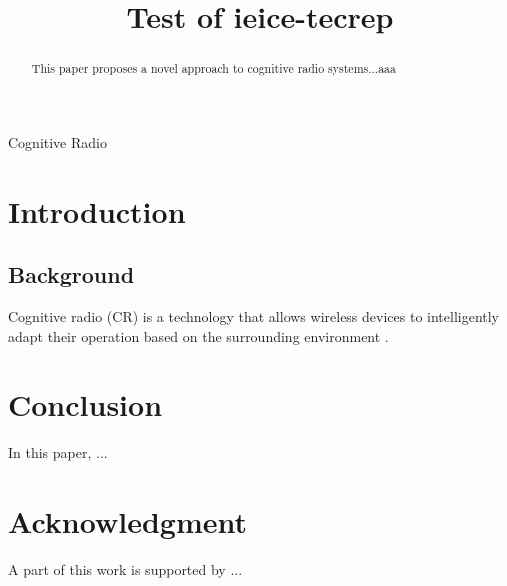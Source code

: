 \documentclass{ieice-tecrep}
\title{Test of ieice-tecrep}
\subtitle{}
\begin{document}
\begin{abstract}
    This paper proposes a novel approach to cognitive radio systems...aaa
\end{abstract}

\begin{keyword}
    Cognitive Radio
\end{keyword}

\maketitle

\section{Introduction}
    
    \subsection{Background}
        Cognitive radio (CR) is a technology that allows wireless devices to intelligently adapt their operation based on the surrounding environment \cite{1391031}.

\section{Conclusion}
    In this paper, ...

\section*{Acknowledgment}
    A part of this work is supported by ...
    
    
    
    
    
    
\end{document}
